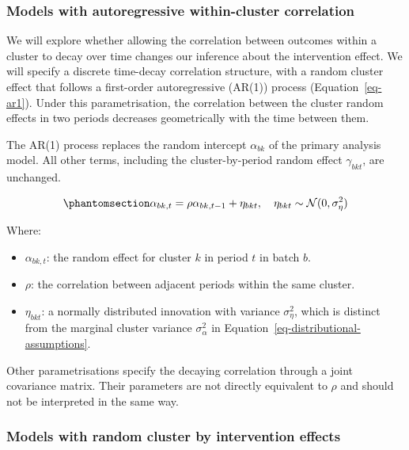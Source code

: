 \documentclass[
]{scrartcl}
\providecommand{\tightlist}{%
  \setlength{\itemsep}{0pt}\setlength{\parskip}{0pt}}\usepackage{longtable,booktabs,array}
\begin{document}
\subsubsection{Models with autoregressive within-cluster
correlation}\label{sec-models-with-autoregressive-within-cluster-correlation}

We will explore whether allowing the correlation between outcomes within
a cluster to decay over time changes our inference about the
intervention effect. We will specify a discrete time-decay correlation
structure, with a random cluster effect that follows a first-order
autoregressive (AR(1)) process (Equation~\ref{eq-ar1}). Under this
parametrisation, the correlation between the cluster random effects in
two periods decreases geometrically with the time between them.

The AR(1) process replaces the random intercept \(\alpha_{bk}\) of the
primary analysis model. All other terms, including the cluster-by-period
random effect \(\gamma_{bkt}\), are unchanged.

\begin{equation}\phantomsection\label{eq-ar1}{
\alpha_{bk,t} = \rho \alpha_{bk,t-1} + \eta_{bkt}, \quad \eta_{bkt} \sim \mathcal{N}(0, \sigma^2_\eta)
}\end{equation}

Where:

\begin{itemize}
\tightlist
\item
  \(\alpha_{bk,t}\): the random effect for cluster \(k\) in period \(t\)
  in batch \(b\).
\item
  \(\rho\): the correlation between adjacent periods within the same
  cluster.
\item
  \(\eta_{bkt}\): a normally distributed innovation with variance
  \(\sigma^2_\eta\), which is distinct from the marginal cluster
  variance \(\sigma^2_{\alpha}\) in
  Equation~\ref{eq-distributional-assumptions}.
\end{itemize}

Other parametrisations specify the decaying correlation through a joint
covariance matrix. Their parameters are not directly equivalent to
\(\rho\) and should not be interpreted in the same way.

\subsubsection{Models with random cluster by intervention
effects}\label{sec-models-with-random-cluster-by-intervention-effects}
\end{document}
